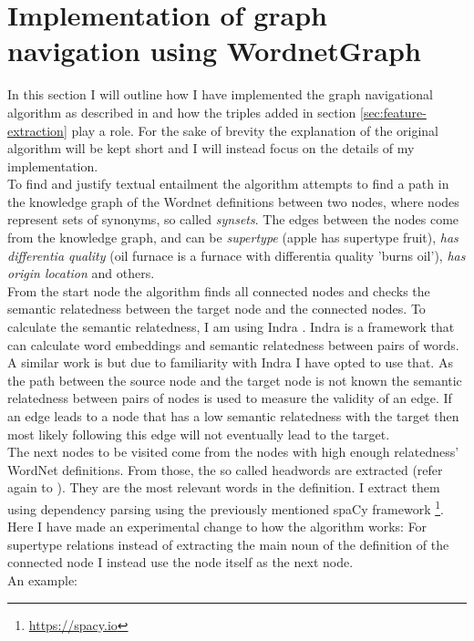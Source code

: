 \section{Implementation of graph navigation using WordnetGraph}
In this section I will outline how I have implemented the graph navigational algorithm as described in \cite{silva2018recognizing} and how the triples added in section \ref{sec:feature-extraction} play a role. For the sake of brevity the explanation of the original algorithm will be kept short and I will instead focus on the details of my implementation.\\
To find and justify textual entailment the algorithm attempts to find a path in the knowledge graph of the Wordnet definitions between two nodes, where nodes represent sets of synonyms, so called \textit{synsets}. The edges between the nodes come from the knowledge graph, and can be \textit{supertype} (apple has supertype fruit), \textit{has differentia quality} (oil furnace is a furnace with differentia quality 'burns oil'), \textit{has origin location} and others.\\
From the start node the algorithm finds all connected nodes and checks the semantic relatedness between the target node and the connected nodes. To calculate the semantic relatedness, I am using Indra \cite{indra2018}. Indra is a framework that can calculate word embeddings and semantic relatedness between pairs of words. A similar work is \cite{patwardhan2006using} but due to familiarity with Indra I have opted to use that. As the path between the source node and the target node is not known the semantic relatedness between pairs of nodes is used to measure the validity of an edge. If an edge leads to a node that has a low semantic relatedness with the target then most likely following this edge will not eventually lead to the target.\\
The next nodes to be visited come from the nodes with high enough relatedness' WordNet definitions. From those, the so called headwords are extracted (refer again to \cite{silva2018recognizing}). They are the most relevant words in the definition. I extract them using dependency parsing using the previously mentioned spaCy framework \footnote{\url{https://spacy.io}}.\\
Here I have made an experimental change to how the algorithm works: For supertype relations instead of extracting the main noun of the definition of the connected node I instead use the node itself as the next node.\\
An example:
